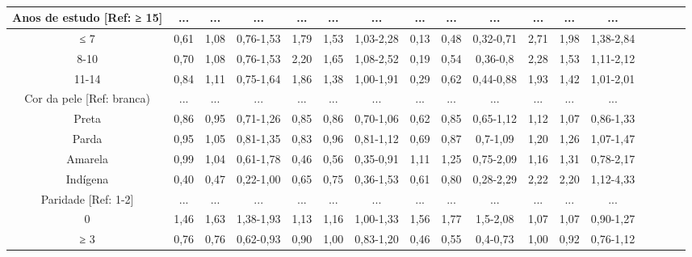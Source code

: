 \documentclass{article}
\begin{document}
\begin{table}
\begin{tabulary}{\linewidth}{ C C C C C C C C C C C C C C C C C }
Anos de estudo [Ref: ≥ 15]
& ...
& ...
& ...
& ...
& ...
& ...
& ...
& ...
& ...
& ...
& ...
& ...
\\ \hline

≤ 7
& 0,61
& 1,08
& 0,76-1,53
& 1,79
& 1,53
& 1,03-2,28
& 0,13
& 0,48
& 0,32-0,71
& 2,71
& 1,98
& 1,38-2,84
\\ \hline

8-10
& 0,70
& 1,08
& 0,76-1,53
& 2,20
& 1,65
& 1,08-2,52
& 0,19
& 0,54
& 0,36-0,8
& 2,28
& 1,53
& 1,11-2,12
\\ \hline

11-14
& 0,84
& 1,11
& 0,75-1,64
& 1,86
& 1,38
& 1,00-1,91
& 0,29
& 0,62
& 0,44-0,88
& 1,93
& 1,42
& 1,01-2,01
\\ \hline

Cor da pele [Ref: branca)
& ...
& ...
& ...
& ...
& ...
& ...
& ...
& ...
& ...
& ...
& ...
& ...
\\ \hline

Preta
& 0,86
& 0,95
& 0,71-1,26
& 0,85
& 0,86
& 0,70-1,06
& 0,62
& 0,85
& 0,65-1,12
& 1,12
& 1,07
& 0,86-1,33
\\ \hline

Parda
& 0,95
& 1,05
& 0,81-1,35
& 0,83
& 0,96
& 0,81-1,12
& 0,69
& 0,87
& 0,7-1,09
& 1,20
& 1,26
& 1,07-1,47
\\ \hline

Amarela
& 0,99
& 1,04
& 0,61-1,78
& 0,46
& 0,56
& 0,35-0,91
& 1,11
& 1,25
& 0,75-2,09
& 1,16
& 1,31
& 0,78-2,17
\\ \hline

Indígena
& 0,40
& 0,47
& 0,22-1,00
& 0,65
& 0,75
& 0,36-1,53
& 0,61
& 0,80
& 0,28-2,29
& 2,22
& 2,20
& 1,12-4,33
\\ \hline

Paridade [Ref: 1-2]
& ...
& ...
& ...
& ...
& ...
& ...
& ...
& ...
& ...
& ...
& ...
& ...
\\ \hline

0
& 1,46
& 1,63
& 1,38-1,93
& 1,13
& 1,16
& 1,00-1,33
& 1,56
& 1,77
& 1,5-2,08
& 1,07
& 1,07
& 0,90-1,27
\\ \hline

≥ 3
& 0,76
& 0,76
& 0,62-0,93
& 0,90
& 1,00
& 0,83-1,20
& 0,46
& 0,55
& 0,4-0,73
& 1,00
& 0,92
& 0,76-1,12
\\ \hline

\end{tabulary}
\caption*{\footnotesize }
\caption{}
\end{table}
\end{document}
